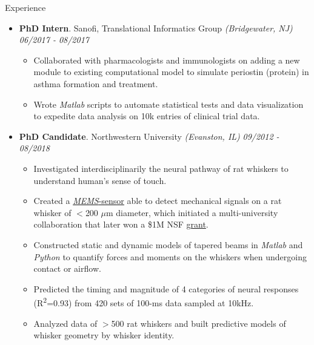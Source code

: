 \documentclass{resume} %
\begin{document}
\begin{rSection}{Experience}
\begin{itemize}[leftmargin=0em]
			\item {\bf PhD Intern}{. Sanofi, Translational Informatics Group \textit{(Bridgewater, NJ)}} \hfill {\em 06/2017 - 08/2017}\\
			\vspace{-5mm}
			\begin{itemize}
				\setlength\itemsep{-1.75em}	
				\item Collaborated with pharmacologists and immunologists on adding a new module to existing computational model to simulate periostin (protein) in asthma formation and treatment.\\
				\item Wrote \textit{Matlab} scripts to automate statistical tests and data visualization to expedite data analysis on 10k entries of clinical trial data.
			\end{itemize}
			
			\item {\bf PhD Candidate}{. Northwestern University \textit{(Evanston, IL)}} \hfill {\em 09/2012 - 08/2018}\\
			\vspace{-5mm}
			\begin{itemize}
				\setlength\itemsep{-1.75em}
				\item Investigated interdisciplinarily the neural pathway of rat whiskers to understand human's sense of touch.\\
				\item Created a \href{https://www.youtube.com/watch?v=EPuThXPd-qw}{\textit{MEMS}-sensor} able to detect mechanical signals on a rat whisker of $<$200 $\mu$m diameter, which initiated a multi-university collaboration that later won a \$1M NSF \href{https://www.nsf.gov/news/mmg/mmg_disp.jsp?med_id=132588}{grant}.\\
				\item Constructed static and dynamic models of tapered beams in \textit{Matlab} and \textit{Python} to quantify forces and moments on the whiskers when undergoing contact or airflow.\\
				\item Predicted the timing and magnitude of 4 categories of neural responses (R\textsuperscript{2}=0.93) from 420 sets of 100-ms data sampled at 10kHz.\\
				\item Analyzed data of $>$500 rat whiskers and built predictive models of whisker geometry by whisker identity.	
			\end{itemize}
			
			
		\end{itemize}
		
	\end{rSection}
	
\end{document}
